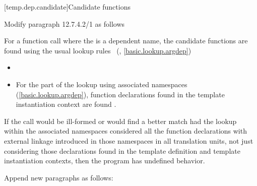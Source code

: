 [temp.dep.candidate]{Candidate functions}

\noindent
Modify paragraph 12.7.4.2/1 as follows
\begin{std.txt}
\pnum[1]
For a function call where the  is a
dependent name,
the candidate functions are found using the usual lookup
rules ~(, \ref{basic.lookup.argdep})
\added{\enternote}
\begin{itemize}
\item
{}
\item
For the part of the lookup using associated namespaces (\ref{basic.lookup.argdep}),
 function declarations found in  the template instantiation context are found
.
\end{itemize}
\added{\exitnote}
If the call would be ill-formed or would find a better match had the 
lookup within the associated namespaces considered all the function 
declarations with external
linkage introduced in those namespaces in all
translation units, not just considering those declarations found in the 
template definition and template instantiation contexts, then the program 
has undefined behavior.
\end{std.txt}

Append new paragraphs as follows:

